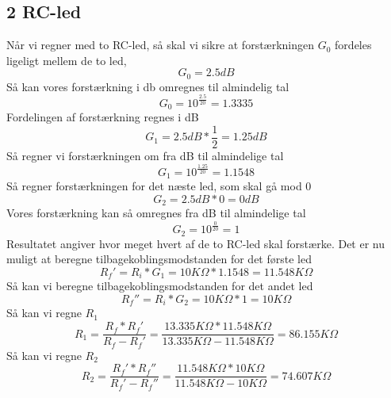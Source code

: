 \subsection{2 RC-led}
%
Når vi regner med to RC-led, så skal vi sikre at forstærkningen $G_{0}$ fordeles ligeligt mellem de to led, 
%
\begin{equation}
	G_0 = 2.5dB
\end{equation}
\noindent
%
Så kan vores forstærkning i db omregnes til almindelig tal
%
\begin{equation}
	G_0 = 10^{\frac{2.5}{20}} = 1.3335
\end{equation}
\noindent
%
Fordelingen af forstærkning regnes i dB
%
\begin{equation}
	G_1 = 2.5dB*\frac{1}{2} = 1.25dB
\end{equation}
\noindent
%
Så regner vi forstærkningen om fra dB til almindelige tal
%
\begin{equation}
	G_1 = 10^{\frac{1.25}{20}} = 1.1548
\end{equation}
\noindent
%
Så regner forstærkningen for det næste led, som skal gå mod 0
%
\begin{equation}
	G_2 = 2.5dB*0 = 0dB
\end{equation}
\noindent
%
Vores forstærkning kan så omregnes fra dB til almindelige tal
%
\begin{equation}
	G_2 = 10^{\frac{0}{20}} = 1
\end{equation}
\noindent
%
Resultatet angiver hvor meget hvert af de to RC-led skal forstærke. Det er nu muligt at beregne tilbagekoblingsmodstanden for det første led
%
\begin{equation}
	R_f' = R_i*G_1 = 10K\Omega*1.1548 = 11.548K\Omega
\end{equation}
\noindent
%
Så kan vi beregne tilbagekoblingsmodstanden for det andet led
%
\begin{equation}
	R_f'' = R_i*G_2 = 10K\Omega*1 = 10K\Omega
\end{equation}
\noindent
%
Så kan vi regne $R_{1}$
%
\begin{equation}
	R_1 = \frac{R_f*R_f'}{R_f-R_f'} = \frac{13.335K\Omega*11.548K\Omega}{13.335K\Omega-11.548K\Omega} = 86.155K\Omega
\end{equation}
\noindent
%
Så kan vi regne $R_{2}$
%
\begin{equation}
	R_2 = \frac{R_f'*R_f''}{R_f'-R_f''} = \frac{11.548K\Omega*10K\Omega}{11.548K\Omega-10K\Omega} = 74.607K\Omega
\end{equation}
\noindent
